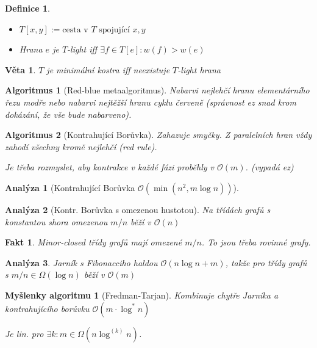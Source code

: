 \documentclass{article}
\theoremstyle{noparens}
\newtheorem*{thm}{Věta}
\newtheorem*{alg}{Algoritmus}
\newtheorem*{anal}{Analýza}
\newtheorem*{definition}{Definice}
\newtheorem*{fakt}{Fakt}
\theoremstyle{noparens-mys}
\newtheorem*{alg-mys}{Myšlenky algoritmu}
\theoremstyle{noparens-note}
\newcommand{\OO}{\mathcal{O}}
\begin{document}
\begin{definition}
    ~

    \begin{itemize}
        \item $T[x, y] := \text{cesta v } T \text{ spojující } x,y$
        \item Hrana $e$ je $T$-light iff $\exists f \in T[e]: w(f) > w(e)$
    \end{itemize}
\end{definition}

\begin{thm}
    $T$ je minimální kostra iff neexistuje $T$-light hrana
\end{thm}

\begin{alg}[Red-blue metaalgoritmus]
Nabarvi nejlehčí hranu elementárního řezu modře nebo
nabarvi nejtěžší hranu cyklu červeně (správnost ez snad krom dokázání, že vše
bude nabarveno).
\end{alg}

\begin{alg}[Kontrahující Borůvka]
  Zahazuje smyčky.  Z paralelních hran vždy zahodí všechny kromě nejlehčí
  (red rule).

  Je třeba rozmyslet, aby kontrakce v každé fázi proběhly v $\OO(m)$. (vypadá ez)
\end{alg}

\begin{anal}[Kontrahující Borůvka $\OO(\min(n^2, m \log n))$]
\end{anal}

\begin{anal}[Kontr. Borůvka s omezenou hustotou]
    Na třídách grafů s konstantou shora omezenou $m / n$ běží v $\OO(n)$
\end{anal}

\begin{fakt}
Minor-closed třídy grafů mají omezené $m / n$. To jsou třeba rovinné grafy.
\end{fakt}

\begin{anal}
Jarník s Fibonacciho haldou $\OO(n \log n + m)$, takže pro třídy grafů s $m / n
    \in \Omega(\log n)$ běží v $\OO(m)$
\end{anal}

\begin{alg-mys}[Fredman-Tarjan]
    Kombinuje chytře Jarníka a kontrahujícího borůvku $\OO(m \cdot \log^* n)$

    Je lin. pro $\exists k: m \in \Omega(n \log^{(k)} n)$.
\end{alg-mys}
\end{document}

